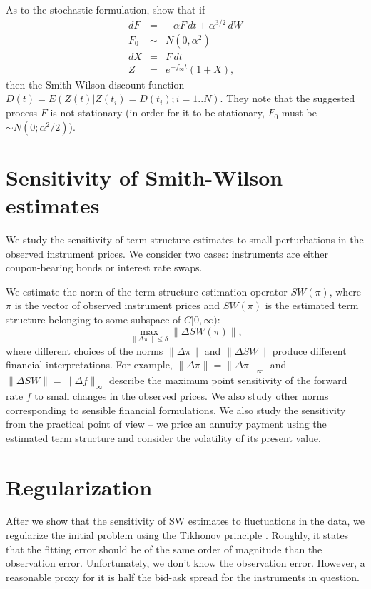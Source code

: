 \documentclass[a4paper]{iccf2017}
\begin{document}
As to the stochastic formulation, \cite{Andersson_Lindholm, Lager} show that if
\begin{eqnarray*}
dF &=& -\alpha F\,dt + \alpha^{3/2}\, dW\\
F_0 &\sim& N(0, \alpha^2)\\
dX &=& F \,dt\\
Z &=& e^{-f_\infty t}(1 + X),
\end{eqnarray*}
then the Smith-Wilson discount function $D(t)=E\left(Z(t)\big|Z(t_i) = D(t_i);i=1..N\right)$. They note that the suggested process $F$ is not stationary (in order for it to be stationary, $F_0$ must be $\sim N(0;\alpha^2/2)$).

\section{Sensitivity of Smith-Wilson estimates}
We study the sensitivity of term structure estimates to small perturbations in the observed instrument prices. We consider two cases: instruments are either coupon-bearing bonds or interest rate swaps.

We estimate the norm of the term structure estimation operator $SW(\pi)$, where $\pi$ is the vector of observed instrument prices and $SW(\pi)$ is the estimated term structure belonging to some subspace of $C[0,\infty)$:
$$
\max\limits_{\|\Delta\pi\|\leq \delta}\left\|\Delta SW(\pi)\right\|,
$$
where different choices of the norms $\|\Delta\pi\|$ and $\|\Delta SW\|$ produce different financial interpretations. For example, $\|\Delta\pi\|=\|\Delta\pi\|_\infty$ and $\|\Delta SW\|=\|\Delta f\|_\infty$ describe the maximum point sensitivity of the forward rate $f$ to small changes in the observed prices. We also study other norms corresponding to sensible financial formulations. We also study the sensitivity from the practical point of view -- we price an annuity payment using the estimated term structure and consider the volatility of its present value.

\section{Regularization}
After we show that the sensitivity of SW estimates to fluctuations in the data, we regularize the initial problem using the Tikhonov principle \cite{Tikhonov}. Roughly, it states that the fitting error should be of the same order of magnitude than the observation error. Unfortunately, we don't know the observation error. However, a reasonable proxy for it is half the bid-ask spread for the instruments in question.
\end{document}
